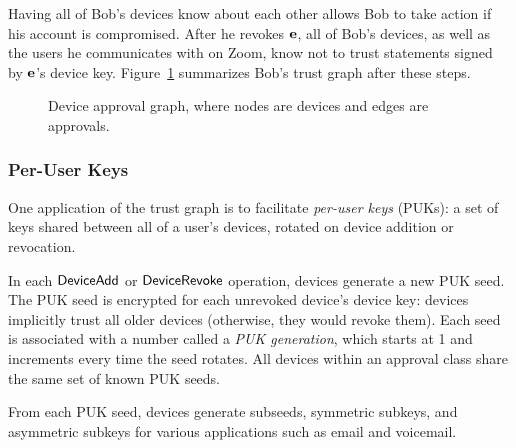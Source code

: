 Having all of Bob's devices know about each other allows Bob to take action if his account is
compromised. After he revokes $\mathbf{e}$, all of Bob's devices, as well as the users he communicates
with on Zoom, know not to trust statements signed by $\mathbf{e}$'s device key.
Figure~\ref{fig:devices} summarizes Bob's trust graph after these steps.

\begin{figure}
\centering
{}
\caption{Device approval graph, where nodes are devices and edges are approvals.}
\label{fig:devices}
\end{figure}

\subsubsection{Per-User Keys}
\label{subsubsec:puks}

One application of the trust graph is to facilitate \textit{per-user keys} (PUKs): a set of keys
shared between all of a user's devices, rotated on device addition or revocation.

In each $\mathsf{DeviceAdd}{}$ or $\mathsf{DeviceRevoke}{}$ operation, devices generate a new PUK seed. The PUK seed
is encrypted for each unrevoked device's device key: devices implicitly trust all older devices
(otherwise, they would revoke them). Each seed is associated with a number called a \textit{PUK
generation}, which starts at 1 and increments every time the seed rotates. All devices within an
approval class share the same set of known PUK seeds.

From each PUK seed, devices generate subseeds, symmetric subkeys, and asymmetric subkeys for various
applications such as email and voicemail.

